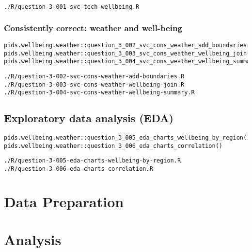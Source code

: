 \documentclass[12pt, oneside, openany]{book}
\begin{document}
\begin{verbatim}
./R/question-3-001-svc-tech-wellbeing.R
\end{verbatim}

\subsubsection*{Consistently correct: weather and well-being}

\begin{verbatim}
pids.wellbeing.weather::question_3_002_svc_cons_weather_add_boundaries()
pids.wellbeing.weather::question_3_003_svc_cons_weather_wellbeing_join()
pids.wellbeing.weather::question_3_004_svc_cons_weather_wellbeing_summary()
\end{verbatim}

\begin{verbatim}
./R/question-3-002-svc-cons-weather-add-boundaries.R
./R/question-3-003-svc-cons-weather-wellbeing-join.R
./R/question-3-004-svc-cons-weather-wellbeing-summary.R
\end{verbatim}

\subsection*{Exploratory data analysis (EDA)}

\begin{verbatim}
pids.wellbeing.weather::question_3_005_eda_charts_wellbeing_by_region()
pids.wellbeing.weather::question_3_006_eda_charts_correlation()
\end{verbatim}

\begin{verbatim}
./R/question-3-005-eda-charts-wellbeing-by-region.R
./R/question-3-006-eda-charts-correlation.R
\end{verbatim}

\section*{Data Preparation}

\section*{Analysis}
\end{document}
